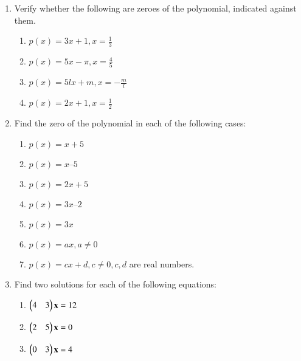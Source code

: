 \renewcommand{\theequation}{\theenumi}
\begin{enumerate}[label=\arabic*.,ref=\thesubsection.\theenumi]
%
 \item Verify whether the following are zeroes of the polynomial, indicated against them. 
\begin{enumerate}
\item $ p(x) = 3x + 1, x = \frac{1}{3}$
\item $ p(x) = 5x -\pi, x = \frac{4}{5}$
\item $ p(x) = 5lx+m, x = -\frac{m}{l}$
\item $ p(x) = 2x+1, x = \frac{1}{2}$
\end{enumerate}
%
\solution 

%
\item Find the zero of the polynomial in each of the following cases: 
\begin{enumerate}
\item $p(x) = x + 5 $
\item $p(x) = x – 5$
\item $p(x) = 2x + 5$
\item $p(x) = 3x – 2$
 \item $p(x) = 3x$
 \item $p(x) = ax, a \ne 0$
\item $p(x) = cx + d, c \ne 0, c, d$ are real numbers.
\end{enumerate}
\item Find two solutions for each of the following equations: 
\begin{enumerate}
\item $\begin{pmatrix}4 & 3\end{pmatrix}\mathbf{x} = 12$
\item $\begin{pmatrix} 2 & 5\end{pmatrix}\mathbf{x}  = 0 $
\item $\begin{pmatrix} 0 & 3\end{pmatrix}\mathbf{x}  = 4$
\end{enumerate}
\solution 



\end{enumerate}

